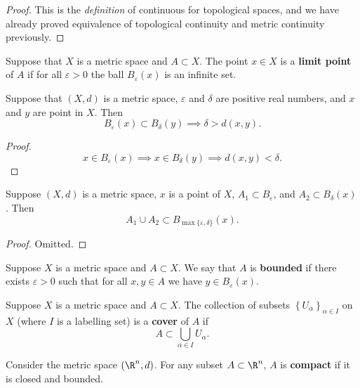 \begin{proof}
	This is the \emph{definition} of continuous for topological spaces, and we 
	have already proved equivalence of topological continuity and metric 
	continuity previously.
\end{proof}

\begin{definition}
	Suppose that $X$ is a metric space and $A \subset X$.
	The point $x \in X$ is a \textbf{limit point} of $A$ if for all
	$\varepsilon > 0$ the ball $B_{\varepsilon}(x)$ is an infinite set.
\end{definition}

\begin{proposition}[]
	Suppose that $(X, d)$ is a metric space, $\varepsilon$ and $\delta$ are
	positive real numbers, and $x$ and $y$ are point in $X$.
	Then
	\[
		B_{\varepsilon}(x) \subset B_{\delta}(y)
		\implies \delta > d(x,y).
	\]
\end{proposition}

\begin{proof}
	\[
		x \in B_{\varepsilon}(x)
		\implies x \in B_{\delta}(y)
		\implies d(x,y) < \delta.
	\]
\end{proof}

\begin{proposition}[]
	Suppose $(X,d)$ is a metric space,
	$x$ is a point of $X$,
	$A_1 \subset B_{\varepsilon}$,
	and $A_2 \subset B_{\delta}(x)$.
	Then
	\[
		A_1 \cup A_2 \subset B_{\max\{\varepsilon, \delta\}}(x).
	\]
\end{proposition}

\begin{proof}
	Omitted.
\end{proof}

\begin{definition}[Bounded]
	Suppose $X$ is a metric space and $A \subset X$.
	We say that $A$ is \textbf{bounded} if there exists $\varepsilon > 0$
	such that for all $x, y \in A$ we have $y \in B_{\varepsilon}(x)$.
\end{definition}

\begin{definition}[Cover]
	Suppose $X$ is a metric space and $A \subset X$.
	The collection of subsets $\left\{ U_\alpha \right\}_{\alpha \in I}$
	on $X$ (where $I$ is a labelling set) is a \textbf{cover} of $A$ if
	\[
		A \subset \bigcup_{\alpha \in I} U_\alpha.
	\]
\end{definition}

\begin{definition}[Compact on $\R^n$]
	Consider the metric space $(\R^n, d)$.
	For any subset $A \subset \R^n$, $A$ is \textbf{compact} if
	it is closed and bounded.
\end{definition}

